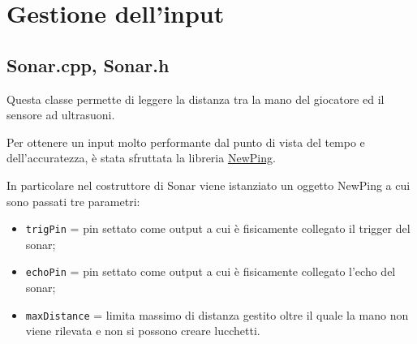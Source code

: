 \section{Gestione dell'input}
\subsection{Sonar.cpp, Sonar.h}
Questa classe permette di leggere la distanza tra la mano del giocatore ed il sensore ad ultrasuoni.

Per ottenere un input molto performante dal punto di vista del tempo e dell'accuratezza, è stata sfruttata la libreria \href{http://playground.arduino.cc/Code/NewPing}{NewPing}.

In particolare nel costruttore di Sonar viene istanziato un oggetto NewPing a cui sono passati tre parametri:
\begin{itemize}
	\item \texttt{trigPin} = pin settato come output a cui è fisicamente collegato il trigger del sonar;
	\item \texttt{echoPin} = pin settato come output a cui è fisicamente collegato l'echo del sonar;
	\item \texttt{maxDistance} = limita massimo di distanza gestito oltre il quale la mano non viene rilevata e non si possono creare lucchetti.
\end{itemize}
